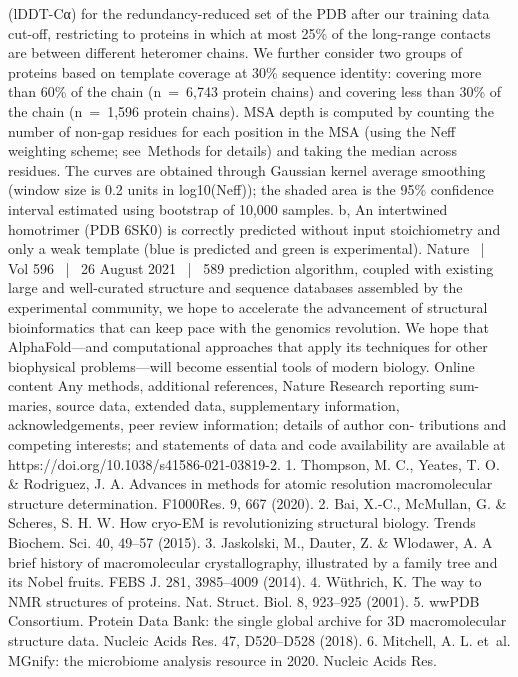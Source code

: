 (lDDT-Cα) for the redundancy-reduced set of the PDB after our training data
cut-off, restricting to proteins in which at most 25\% of the long-range contacts
are between different heteromer chains. We further consider two groups of
proteins based on template coverage at 30\% sequence identity: covering more
than 60\% of the chain (n = 6,743 protein chains) and covering less than 30\% of
the chain (n = 1,596 protein chains). MSA depth is computed by counting the
number of non-gap residues for each position in the MSA (using the Neff
weighting scheme; see Methods for details) and taking the median across
residues. The curves are obtained through Gaussian kernel average smoothing
(window size is 0.2 units in log10(Neff)); the shaded area is the 95\% confidence
interval estimated using bootstrap of 10,000 samples. b, An intertwined
homotrimer (PDB 6SK0) is correctly predicted without input stoichiometry
and only a weak template (blue is predicted and green is experimental).
Nature  |  Vol 596  |  26 August 2021  |  589
prediction algorithm, coupled with existing large and well-curated
structure and sequence databases assembled by the experimental
community, we hope to accelerate the advancement of structural
bioinformatics that can keep pace with the genomics revolution. We
hope that AlphaFold—and computational approaches that apply its
techniques for other biophysical problems—will become essential
tools of modern biology.
Online content
Any methods, additional references, Nature Research reporting sum-
maries, source data, extended data, supplementary information,
acknowledgements, peer review information; details of author con-
tributions and competing interests; and statements of data and code
availability are available at https://doi.org/10.1038/s41586-021-03819-2.
1.
Thompson, M. C., Yeates, T. O. \& Rodriguez, J. A. Advances in methods for atomic
resolution macromolecular structure determination. F1000Res. 9, 667 (2020).
2.
Bai, X.-C., McMullan, G. \& Scheres, S. H. W. How cryo-EM is revolutionizing structural
biology. Trends Biochem. Sci. 40, 49–57 (2015).
3.
Jaskolski, M., Dauter, Z. \& Wlodawer, A. A brief history of macromolecular crystallography,
illustrated by a family tree and its Nobel fruits. FEBS J. 281, 3985–4009 (2014).
4.
Wüthrich, K. The way to NMR structures of proteins. Nat. Struct. Biol. 8, 923–925 (2001).
5.
wwPDB Consortium. Protein Data Bank: the single global archive for 3D macromolecular
structure data. Nucleic Acids Res. 47, D520–D528 (2018).
6.
Mitchell, A. L. et al. MGnify: the microbiome analysis resource in 2020. Nucleic Acids Res.
